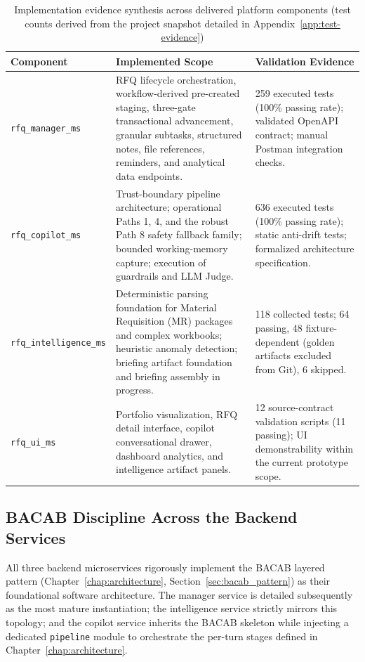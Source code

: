 \begin{table}[H]
\centering
\scriptsize
\renewcommand{\arraystretch}{1.3}
\begin{tabularx}{\linewidth}{|p{3cm}|>{\RaggedRight\arraybackslash}X|p{4cm}|}
\hline
\rowcolor{lightgray}
\textbf{Component} & \textbf{Implemented Scope} & \textbf{Validation Evidence} \\ \hline
\texttt{rfq\_manager\_ms} & RFQ lifecycle orchestration, workflow-derived pre-created staging, three-gate transactional advancement, granular subtasks, structured notes, file references, reminders, and analytical data endpoints. & 259 executed tests (100\% passing rate); validated OpenAPI contract; manual Postman integration checks. \\ \hline
\texttt{rfq\_copilot\_ms} & Trust-boundary pipeline architecture; operational Paths 1, 4, and the robust Path 8 safety fallback family; bounded working-memory capture; execution of guardrails and LLM Judge. & 636 executed tests (100\% passing rate); static anti-drift tests; formalized architecture specification. \\ \hline
\texttt{rfq\_intelligence\_ms} & Deterministic parsing foundation for Material Requisition (MR) packages and complex workbooks; heuristic anomaly detection; briefing artifact foundation and briefing assembly in progress. & 118 collected tests; 64 passing, 48 fixture-dependent (golden artifacts excluded from Git), 6 skipped. \\ \hline
\texttt{rfq\_ui\_ms} & Portfolio visualization, RFQ detail interface, copilot conversational drawer, dashboard analytics, and intelligence artifact panels. & 12 source-contract validation scripts (11 passing); UI demonstrability within the current prototype scope. \\ \hline
\end{tabularx}
\caption{Implementation evidence synthesis across delivered platform components (test counts derived from the project snapshot detailed in Appendix~\ref{app:test-evidence})}
\label{tab:impl_evidence}
\end{table}

\subsection{BACAB Discipline Across the Backend Services}
All three backend microservices rigorously implement the BACAB layered pattern (Chapter~\ref{chap:architecture}, Section~\ref{sec:bacab_pattern}) as their foundational software architecture. The manager service is detailed subsequently as the most mature instantiation; the intelligence service strictly mirrors this topology; and the copilot service inherits the BACAB skeleton while injecting a dedicated \texttt{pipeline} module to orchestrate the per-turn stages defined in Chapter~\ref{chap:architecture}.

